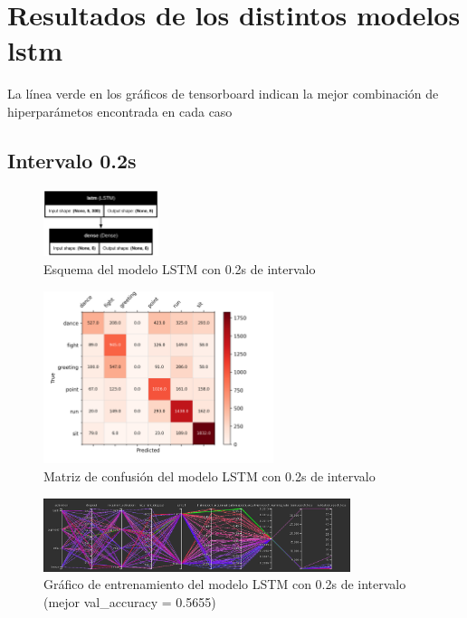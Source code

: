 \chapter{Resultados de los distintos modelos \gls{lstm}}
\label{appendix:resultadosLSTM}

La línea verde en los gráficos de tensorboard indican la mejor combinación de hiperparámetos encontrada en cada caso

\section{Intervalo 0.2s}

\begin{figure}[H]
    \centering
    \includegraphics[width=0.3\textwidth]{Imagenes/Bitmap/best-lstm0.2.png}
    \caption{Esquema del modelo LSTM con 0.2s de intervalo}
    \label{fig:lstm-0.2-final}
\end{figure}
\begin{figure}[H]
    \centering
    \includegraphics[width=0.6\textwidth]{Imagenes/Bitmap/CM_best-lstm0.2.png}
    \caption{Matriz de confusión del modelo LSTM con 0.2s de intervalo}
    \label{fig:lstm-0.2-matriz}
\end{figure}
\begin{figure}[H]
    \centering
    \includegraphics[width=0.8\textwidth]{Imagenes/Bitmap/tb-lstm-0.2.png}
    \caption{Gráfico de entrenamiento del modelo LSTM con 0.2s de intervalo (mejor val\_accuracy = 0.5655)}
    \label{fig:lstm-0.2-grafico}
\end{figure}

